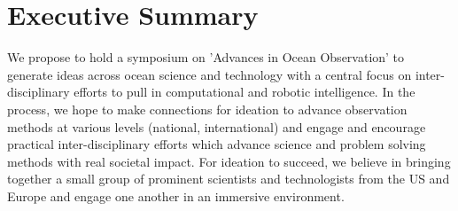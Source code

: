 \section*{Executive Summary}

We propose to hold a symposium on 'Advances in Ocean Observation' to
generate ideas across ocean science and technology with a central focus
on inter-disciplinary efforts to pull in computational and robotic
intelligence.  In the process, we hope to make connections for ideation
to advance observation methods at various levels (national,
international) and engage and encourage practical inter-disciplinary
efforts which advance science and problem solving methods with real
societal impact. For ideation to succeed, we believe in bringing
together a small group of prominent scientists and technologists from
the US and Europe and engage one another in an immersive environment.


